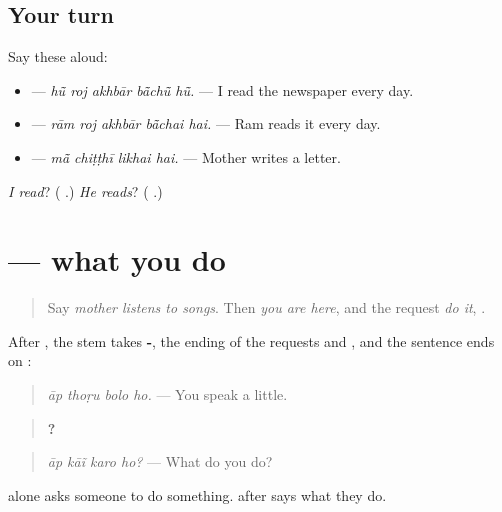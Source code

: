 \subsection*{Your turn}
Say these aloud:

\begin{itemize}
\raggedright
  \item \textbf{    } — \emph{hū̃ roj akhbār bā̃chū̃ hū̃.} — I read the newspaper every day.
  \item \textbf{    } — \emph{rām roj akhbār bā̃chai hai.} — Ram reads it every day.
  \item \textbf{   } — \emph{mā̃ chiṭṭhī likhai hai.} — Mother writes a letter.
\end{itemize}

\begin{tcolorbox}[breakable,colback=teal!4,colframe=teal!35!black,title={Before you move on}]
\emph{I read}? (\textbf{  }.) \emph{He reads}? (\textbf{  }.)
\end{tcolorbox}
\section[\texorpdfstring{\mw{बोलो} \mw{हो} (bolo ho)}{बोलो हो (bolo ho)}]{   — what you do}

\label{lesson:MW-C154-bolo-ho}



\begin{quote}
Say \emph{mother listens to songs}. Then \emph{you are here}, and the request \emph{do it}, \textbf{}.
\end{quote}

\begin{grammarlens}[title={Grammar Lens: -\mw{ो} and \mw{हो}}]
After \textbf{}, the stem takes \textbf{-}, the ending of the requests \textbf{} and \textbf{}, and the sentence ends on \textbf{}:

\begin{quote}
\textbf{   }
\end{quote}

\begin{quote}
\emph{āp thoṛu bolo ho.} — You speak a little.
\end{quote}

\begin{quote}
\textbf{   ?}
\end{quote}

\begin{quote}
\emph{āp kāĩ karo ho?} — What do you do?
\end{quote}

\textbf{} alone asks someone to do something. \textbf{ } after \textbf{} says what they do.
\end{grammarlens}

